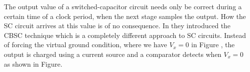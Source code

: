 The output value of a switched-capacitor circuit needs only be correct
during a certain time of a clock period, when the next stage samples
the output. How the SC circuit arrives at this value is of no
consequence. In \cite{sepke06} they introduced the CBSC technique
which is a completely different approach to SC circuits. Instead of
forcing the virtual ground condition, where we have $V_x=0$ in
Figure \label{fig:sc-ota}, the output is charged using a current
source and a comparator detects when $V_x = 0$ as shown in Figure\label{fig:sc-cbsc}.



